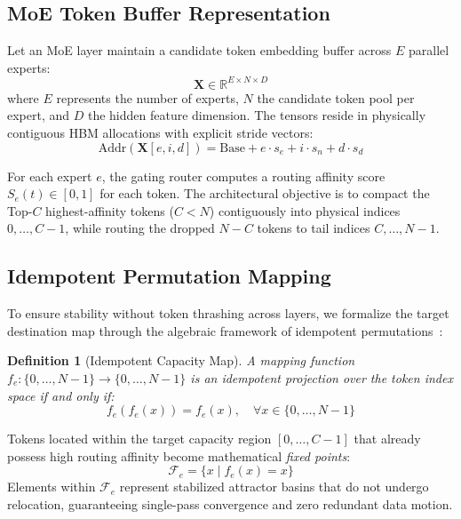 \documentclass[10pt,twocolumn]{article}
\newtheorem{definition}{Definition}
\begin{document}
\subsection{MoE Token Buffer Representation}
Let an MoE layer maintain a candidate token embedding buffer across $E$ parallel experts:
\begin{equation}
    \mathbf{X} \in \mathbb{R}^{E \times N \times D}
\end{equation}
where $E$ represents the number of experts, $N$ the candidate token pool per expert, and $D$ the hidden feature dimension. The tensors reside in physically contiguous HBM allocations with explicit stride vectors:
\begin{equation}
    \text{Addr}(\mathbf{X}[e, i, d]) = \text{Base} + e \cdot s_{e} + i \cdot s_{n} + d \cdot s_{d}
\end{equation}

For each expert $e$, the gating router computes a routing affinity score $S_e(t) \in [0, 1]$ for each token. The architectural objective is to compact the Top-$C$ highest-affinity tokens ($C < N$) contiguously into physical indices $0, \dots, C-1$, while routing the dropped $N-C$ tokens to tail indices $C, \dots, N-1$.

\subsection{Idempotent Permutation Mapping}
To ensure stability without token thrashing across layers, we formalize the target destination map through the algebraic framework of idempotent permutations~\cite{cetin2013idempotent}:
\begin{definition}[Idempotent Capacity Map]
A mapping function $f_e: \{0, \dots, N-1\} \to \{0, \dots, N-1\}$ is an idempotent projection over the token index space if and only if:
\begin{equation}
    f_e(f_e(x)) = f_e(x), \quad \forall x \in \{0, \dots, N-1\}
    \label{eq:idempotence}
\end{equation}
\end{definition}
Tokens located within the target capacity region $[0, \dots, C-1]$ that already possess high routing affinity become mathematical \textit{fixed points}:
\begin{equation}
    \mathcal{F}_e = \{x \mid f_e(x) = x\}
\end{equation}
Elements within $\mathcal{F}_e$ represent stabilized attractor basins that do not undergo relocation, guaranteeing single-pass convergence and zero redundant data motion.
\end{document}
